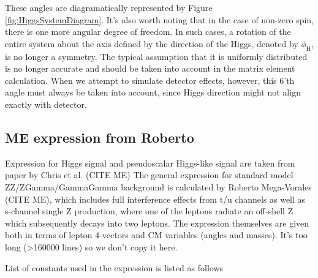 \documentclass{cmspaper}
\begin{document}
These angles are diagramatically represented by Figure \ref{fig:HiggsSystemDiagram}.
It's also worth noting that in the case of non-zero spin, there is one more angular degree of freedom.
In such cases, a rotation of the entire system about the axis defined by the direction of the 
Higgs, denoted by $\phi_{\mathrm{H}}$, is no longer a symmetry. 
The typical assumption that it is uniformly distributed is no longer accurate and should be
taken into account in the matrix element calculation. 
When we attempt to simulate detector effects, however, this 6'th angle must always be taken into account,
since Higgs direction might not align exactly with detector.

\subsection{ME expression from Roberto}

Expression for Higgs signal and pseudoscalar Higgs-like signal are taken from paper by Chris et al. (CITE ME)
The general expression for standard model ZZ/ZGamma/GammaGamma background is calculated by Roberto
Mega-Vorales (CITE ME), which includes full interference effects from t/u channels as well as
s-channel single Z production, where one of the leptons radiate an off-shell Z which subsequently decays into
two leptons.  The expression themselves are given both in terms of lepton 4-vectors and CM variables
(angles and masses).  It's too long (>160000 lines) so we don't copy it here.

List of constants used in the expression is listed as follows
\end{document}
